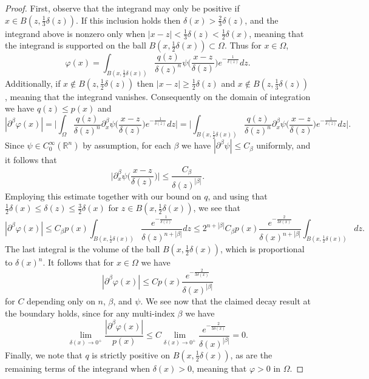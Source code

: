 \documentclass[oneside,hidelinks,indentfirst,10pt]{book}
\begin{document}
\begin{proof}
First, observe that the integrand may only be positive if \(x\in B(z,\frac{1}{3}\delta(z))\). If this inclusion holds then \(\delta(x)>\frac{2}{3}\delta(z)\), and the integrand above is nonzero only when \(|x-z|<\frac{1}{3}\delta(z)<\frac{1}{2}\delta(x)\), meaning that the integrand is supported on the ball \(B(x,\frac{1}{2}\delta(x))\subset\Omega\). Thus for \(x\in\Omega\),
\[
    \varphi(x)=\int_{B(x,\frac{1}{2}\delta(x))}\frac{q(z)}{\delta(z)^n}\psi\bigg(\frac{x-z}{\delta(z)}\bigg)e^{-\frac{1}{\delta(z)}}dz.
\]
Additionally, if \(x\not\in B(z,\frac{1}{2}\delta(z))\) then \(|x-z|\geq \frac{1}{2}\delta(z)\) and \(x\not\in B(z,\frac{1}{3}\delta(z))\), meaning that the integrand vanishes. Consequently on the domain of integration we have \(q(z)\leq p(x)\) and
\[
    |\partial^\beta\varphi(x)|=\bigg|\int_{\Omega}\frac{q(z)}{\delta(z)^n}\partial^\beta_x\psi\bigg(\frac{x-z}{\delta(z)}\bigg)e^{-\frac{1}{\delta(z)}}dz\bigg|=\bigg|\int_{B(x,\frac{1}{2}\delta(x))}\frac{q(z)}{\delta(z)^n}\partial^\beta_x\psi\bigg(\frac{x-z}{\delta(z)}\bigg)e^{-\frac{1}{\delta(z)}}dz\bigg|.
\]
Since \(\psi\in C_0^\infty(\mathbb{R}^n)\) by assumption, for each \(\beta\) we have \(|\partial^\beta\psi|\leq C_\beta\) uniformly, and it follows that
\[
    \bigg|\partial^\beta_x\psi\bigg(\frac{x-z}{\delta(z)}\bigg)\bigg|\leq \frac{C_\beta}{\delta(z)^{|\beta|}}.
\]
Employing this estimate together with our bound on \(q\), and using that \(\frac{1}{2}\delta(x)\leq \delta(z)\leq \frac{3}{2}\delta(x)\) for \(z\in B(x,\frac{1}{2}\delta(x))\), we see that
\[
    |\partial^\beta\varphi(x)|\leq C_\beta p(x)\int_{B(x,\frac{1}{2}\delta(x))}\frac{e^{-\frac{1}{\delta(z)}}}{\delta(z)^{n+|\beta|}}dz\leq  2^{n+|\beta|}C_\beta p(x)\frac{e^{-\frac{2}{3\delta(x)}}}{\delta(x)^{n+|\beta|}}\int_{B(x,\frac{1}{2}\delta(x))}dz.
\]
The last integral is the volume of the ball \(B(x,\frac{1}{2}\delta(x))\), which is proportional to \(\delta(x)^n\). It follows that for \(x\in\Omega\) we have
\begin{equation}\label{eq:nicebound}
    |\partial^\beta\varphi(x)|\leq  C p(x)\frac{e^{-\frac{2}{3\delta(x)}}}{\delta(x)^{|\beta|}}
\end{equation}
for \(C\) depending only on \(n\), \(\beta\), and \(\psi\). We see now that the claimed decay result at the boundary holds, since for any multi-index \(\beta\) we have
\[
    \lim_{\delta(x)\rightarrow0^+}\frac{|\partial^\beta\varphi(x)|}{p(x)}\leq C\lim_{\delta(x)\rightarrow0^+}\frac{e^{-\frac{2}{3\delta(x)}}}{\delta(x)^{|\beta|}}=0.
\]
Finally, we note that \(q\) is strictly positive on \(B(x,\frac{1}{2}\delta(x))\), as are the remaining terms of the integrand when \(\delta(x)>0\), meaning that \(\varphi>0\) in \(\Omega\).
\end{proof}
\end{document}

